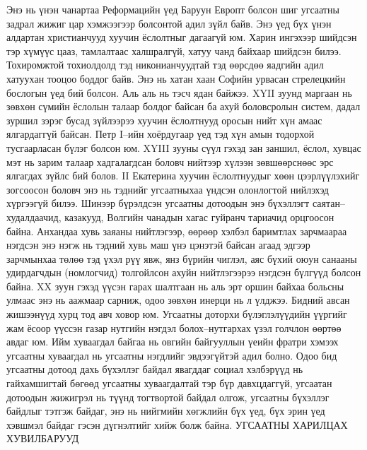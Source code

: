 Энэ нь үнэн чанартаа Реформацийн үед Баруун Европт болсон шиг угсаатны задрал жижиг цар хэмжээгээр болсонтой адил зүйл байв. Энэ үед бүх үнэн алдартан христианчууд хуучин ёслолтныг дагаагүй юм. Харин ингэхээр шийдсэн тэр хүмүүс цааз, тамлалтаас халшралгүй, хатуу чанд байхаар шийдсэн билээ. Тохиромжтой тохиолдолд тэд никонианчуудтай тэд өөрсдөө яадгийн адил хатуухан тооцоо боддог байв. Энэ нь хатан хаан Софийн урвасан стрелецкийн бослогын үед бий болсон. Аль аль нь тэсч ядан байжээ. XYII зуунд маргаан нь зөвхөн сүмийн ёслолын талаар болдог байсан ба ахуй боловсролын систем, дадал зуршил зэрэг бусад зүйлээрээ хуучин ёслолтнууд оросын нийт хүн амаас ялгардаггүй байсан. Петр I–ийн хоёрдугаар үед тэд хүн амын тодорхой тусгаарласан бүлэг болсон юм. XYIII зууны сүүл гэхэд зан заншил, ёслол, хувцас мэт нь зарим талаар хадгалагдсан боловч нийтээр хүлээн зөвшөөрснөөс эрс ялгагдах зүйлс бий болов. II Екатерина хуучин ёслолтнуудыг хөөн цээрлүүлэхийг зогсоосон боловч энэ нь тэднийг угсаатныхаа үндсэн олонлогтой нийлэхэд хүргээгүй билээ. Шинээр бүрэлдсэн угсаатны дотоодын энэ бүхэллэгт саятан–худалдаачид, казакууд, Волгийн чанадын хагас гуйранч тариачид орцгоосон байна. Анхандаа хувь заяаны нийтлэгээр, өөрөөр хэлбэл баримтлах зарчмаараа нэгдсэн энэ нэгж нь тэдний хувь маш үнэ цэнэтэй байсан агаад эдгээр зарчмынхаа төлөө тэд үхэл рүү явж, янз бүрийн чиглэл, аяс бүхий оюун санааны удирдагчдын (номлогчид) толгойлсон ахуйн нийтлэгээрээ нэгдсэн бүлгүүд болсон байна. XX зуун гэхэд үүсэн гарах шалтгаан нь аль эрт оршин байхаа больсны улмаас энэ нь аажмаар сарниж, одоо зөвхөн инерци нь л үлджээ.
Бидний авсан жишээнүүд хурц тод авч ховор юм. Угсаатны доторхи бүлэглэлүүдийн үүргийг жам ёсоор үүссэн газар нутгийн нэгдэл болох–нутгархах үзэл голчлон өөртөө авдаг юм. Ийм хуваагдал байгаа нь овгийн байгууллын үеийн фратри хэмээх угсаатны хуваагдал нь угсаатны нэгдлийг эвдээгүйтэй адил болно.
Одоо бид угсаатны дотоод дахь бүхэллэг байдал явагддаг социал хэлбэрүүд нь гайхамшигтай бөгөөд угсаатны хуваагдалтай тэр бүр давхцдаггүй, угсаатан дотоодын жижигрэл нь түүнд тогтвортой байдал олгож, угсаатны бүхэллэг байдлыг тэтгэж байдаг, энэ нь нийгмийн хөгжлийн бүх үед, бүх эрин үед хэвшмэл байдаг гэсэн дүгнэлтийг хийж болж байна.
УГСААТНЫ ХАРИЛЦАХ ХУВИЛБАРУУД
